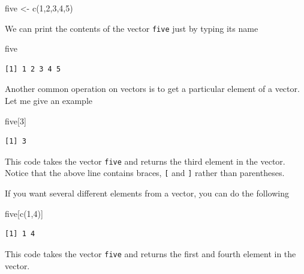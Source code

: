 \documentclass[
  letterpaper,
  DIV=11,
  numbers=noendperiod]{scrreprt}
\newenvironment{Shaded}{\begin{snugshade}}{\end{snugshade}}
\newcommand{\DecValTok}[1]{\textcolor[rgb]{0.68,0.00,0.00}{#1}}
\newcommand{\FunctionTok}[1]{\textcolor[rgb]{0.28,0.35,0.67}{#1}}
\newcommand{\NormalTok}[1]{\textcolor[rgb]{0.00,0.23,0.31}{#1}}
\newcommand{\OtherTok}[1]{\textcolor[rgb]{0.00,0.23,0.31}{#1}}
\begin{document}
\begin{Shaded}
\begin{Highlighting}[]
\NormalTok{  five }\OtherTok{\textless{}{-}} \FunctionTok{c}\NormalTok{(}\DecValTok{1}\NormalTok{,}\DecValTok{2}\NormalTok{,}\DecValTok{3}\NormalTok{,}\DecValTok{4}\NormalTok{,}\DecValTok{5}\NormalTok{)}
\end{Highlighting}
\end{Shaded}

We can print the contents of the vector \texttt{five} just by typing its
name

\begin{Shaded}
\begin{Highlighting}[]
\NormalTok{five}
\end{Highlighting}
\end{Shaded}

\begin{verbatim}
[1] 1 2 3 4 5
\end{verbatim}

Another common operation on vectors is to get a particular element of a
vector. Let me give an example

\begin{Shaded}
\begin{Highlighting}[]
\NormalTok{five[}\DecValTok{3}\NormalTok{]}
\end{Highlighting}
\end{Shaded}

\begin{verbatim}
[1] 3
\end{verbatim}

This code takes the vector \texttt{five} and returns the third element
in the vector. Notice that the above line contains braces, \texttt{{[}}
and \texttt{{]}} rather than parentheses.

If you want several different elements from a vector, you can do the
following

\begin{Shaded}
\begin{Highlighting}[]
\NormalTok{five[}\FunctionTok{c}\NormalTok{(}\DecValTok{1}\NormalTok{,}\DecValTok{4}\NormalTok{)]}
\end{Highlighting}
\end{Shaded}

\begin{verbatim}
[1] 1 4
\end{verbatim}

This code takes the vector \texttt{five} and returns the first and
fourth element in the vector.
\end{document}
